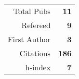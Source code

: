 \begin{table}\begin{tabular}{rr}Total Pubs & \textbf{11}\\Refereed & \textbf{9}\\First Author & \textbf{3}\\Citations & \quad \textbf{186}\\h-index & \textbf{7}\end{tabular}\end{table}